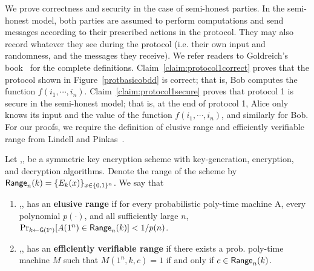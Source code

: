 We prove correctness and security in the case of semi-honest
parties. In the semi-honest model, both parties are assumed to perform
computations and send messages according to their prescribed actions
in the protocol. They may also record whatever they see during the
protocol (i.e. their own input and randomness, and the messages they
receive).  We refer readers to Goldreich's book~\cite{Goldreich:vol2}
for the complete definitions.  Claim~\ref{claim:protocol1correct}
proves that the protocol shown in Figure~\ref{protbasicobdd} is
correct; that is, Bob computes the function $f(i_1,\cdots,i_n)$.
Claim~\ref{claim:protocol1secure} proves that protocol 1 is secure
in the semi-honest model; that is, at the end of protocol 1, Alice only
knows its input and the value of the function $f(i_1,\cdots,i_n)$, and
similarly for Bob. For our proofs, we require the definition of elusive range and
efficiently verifiable range from Lindell and Pinkas~\cite{LP04}.
\begin{definition}
Let ,, be a symmetric key encryption scheme
with key-generation, encryption, and decryption algorithms.
Denote the range of the scheme by
$\mathsf{Range}_n(k)=\{E_k(x)\}_{x\in\{0,1\}^n}$. We say that
\begin{enumerate}
	\item {},, has an \textbf{elusive range}
	if for every probabilistic poly-time machine A, every
	polynomial $p(\cdot)$, and all sufficiently large $n$,
	$\Pr_{k{\gets}\mathsf{G(1^n)}}[A(1^n)\in\mathsf{Range}_n(k)]<1/p(n)$.

	\item {},, has an \textbf{efficiently
	verifiable range} if there exists a prob. poly-time
	machine $M$ such that $M(1^n,k,c)=1$ if and only if
	$c\in\mathsf{Range}_n(k)$.
\end{enumerate}
\end{definition}

